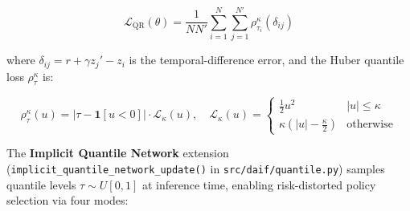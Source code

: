 \documentclass[
]{article}
\begin{document}
\begin{equation}
\mathcal{L}_{\text{QR}}(\theta) = \frac{1}{N N'} \sum_{i=1}^{N} \sum_{j=1}^{N'} \rho_{\tau_i}^{\kappa}\!\left(\delta_{ij}\right)
\label{eq:eq-7c-qr}
\end{equation}

where \(\delta_{ij} = r + \gamma z_j' - z_i\) is the temporal-difference
error, and the Huber quantile loss \(\rho_{\tau}^{\kappa}\) is:

\begin{equation}
\rho_{\tau}^{\kappa}(u) = |\tau - \mathbf{1}[u < 0]| \cdot \mathcal{L}_{\kappa}(u), \quad \mathcal{L}_{\kappa}(u) = \begin{cases} \frac{1}{2}u^2 & |u| \leq \kappa \\ \kappa(|u| - \frac{\kappa}{2}) & \text{otherwise} \end{cases}
\label{eq:eq-7c-huber}
\end{equation}

The \textbf{Implicit Quantile Network} extension
(\texttt{implicit\_quantile\_network\_update()} in
\texttt{src/daif/quantile.py}) samples quantile levels
\(\tau \sim U[0,1]\) at inference time, enabling risk-distorted policy
selection via four modes:
\end{document}
